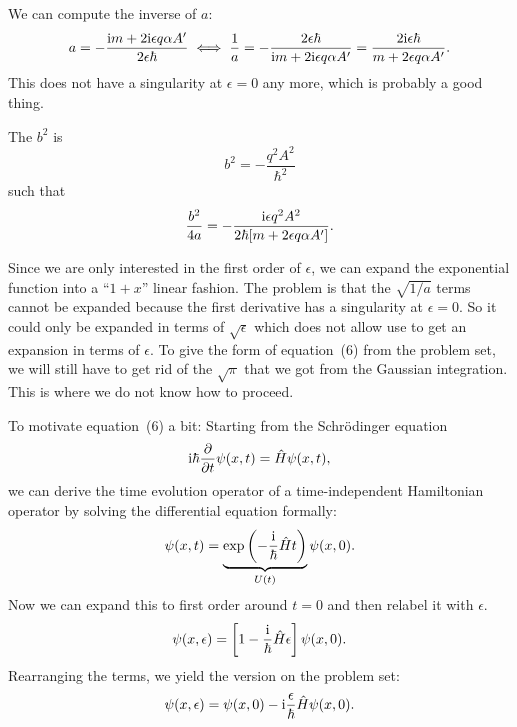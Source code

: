 \documentclass[11pt, english, fleqn, DIV=15, headinclude, BCOR=1.5cm]{scrartcl}
\begin{document}
We can compute the inverse of $a$:
\[
    a = - \frac{\mathrm i m + 2 \mathrm i \epsilon q \alpha A'}{2 \epsilon \hbar}
    \iff
    \frac 1a
    = - \frac{2 \epsilon \hbar}{\mathrm i m + 2 \mathrm i \epsilon q \alpha A'}
    = \frac{2 \mathrm i \epsilon \hbar}{m + 2 \epsilon q \alpha A'}.
\]
This does not have a singularity at $\epsilon = 0$ any more, which is
probably a good thing.

The $b^2$ is
\[
    b^2 = - \frac{q^2A^2}{\hbar^2}
\]
such that
\[
    \frac{b^2}{4a} = - \frac{\mathrm i \epsilon q^2A^2}{2
    \hbar [m + 2 \epsilon q \alpha A']}.
\]

Since we are only interested in the first order of $\epsilon$, we can
expand the exponential function into a “$1 + x$” linear fashion. The
problem is that the $\sqrt{1/a}$ terms cannot be expanded because the first
derivative has a singularity at $\epsilon = 0$. So it could only be expanded in
terms of $\sqrt\epsilon$ which does not allow use to get an expansion in terms
of $\epsilon$. To give the form of equation~(6) from the problem set, we will
still have to get rid of the $\sqrt\pi$ that we got from the Gaussian
integration. This is where we do not know how to proceed.

To motivate equation~(6) a bit: Starting from the Schrödinger equation
\[
    \mathrm i \hbar \frac{\partial {}}{\partial {t}} \psi(x, t) = \hat H \psi(x, t),
\]
we can derive the time evolution operator of a time-independent Hamiltonian
operator by solving the differential equation formally:
\[
    \psi(x, t) = \underbrace{\exp\left( -\frac{\mathrm i}{\hbar} \hat H t \right)}_{U(t)}
    \psi(x, 0).
\]
Now we can expand this to first order around $t = 0$ and then relabel it with
$\epsilon$.
\[
    \psi(x, \epsilon) = \left[ 1 - \frac{\mathrm i}{\hbar} \hat H \epsilon \right] \psi(x, 0).
\]
Rearranging the terms, we yield the version on the problem set:
\[
    \psi(x, \epsilon) = \psi(x, 0) - \mathrm i \frac{\epsilon}{\hbar} \hat H \psi(x, 0).
\]
\end{document}
